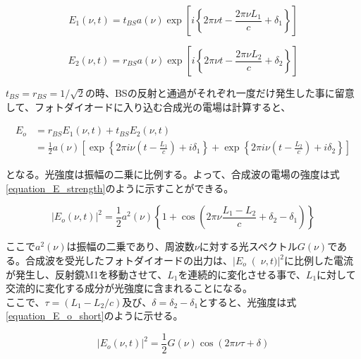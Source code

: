\documentclass[uplatex, titlepage, fontsize=10pt, paper=a4paper]{jsarticle}
\numberwithin{equation}{section}
\begin{document}
\begin{equation}
    E_{1}(\nu, t) = t_{BS}a(\nu)\exp\left[i\left\{{2{\pi\nu}t-{\frac{2{\pi\nu}L_1}{c}}+\delta_1}\right\}\right] 
    \label{equation_E_M1}
\end{equation}

\begin{equation}
    E_{2}(\nu, t) = r_{BS}a(\nu)\exp\left[i\left\{{2{\pi\nu}t-{\frac{2{\pi\nu}L_2}{c}}+\delta_2}\right\}\right] 
    \label{equation_E_M2}
\end{equation}

$t_{BS}=r_{BS}=1/\sqrt{2}$の時、BSの反射と通過がそれぞれ一度だけ発生した事に留意して、フォトダイオードに入り込む合成光の電場は計算すると、

\begin{equation}
    \begin{split}
    E_{o}&=r_{BS}E_{1}(\nu,t)+t_{BS}E_{2}(\nu,t)\\
    &=\frac{1}{2}a(\nu)\left[\exp \left\{2\pi{i\nu}\left(t-\frac{L_1}{c}\right)+i\delta_1 \right\}+\exp \left\{2\pi{i\nu}\left(t-\frac{L_2}{c}\right)+i\delta_2 \right\} \right] 
    \label{equation_E_o}
    \end{split}
\end{equation}

となる。光強度は振幅の二乗に比例する。よって、合成波の電場の強度は式\ref{equation_E_strength}のように示すことができる。

\begin{equation}
    {\left\lvert E_{o}(\nu, t)\right\rvert} ^2 = \frac{1}{2}a^{2}(\nu)\left\{1+\cos\left(2\pi\nu\frac{L_{1}-L_{2}}{c}+\delta_{2}-\delta_{1}\right) \right\} 
    \label{equation_E_strength}
\end{equation}

ここで$a^{2}(\nu)$は振幅の二乗であり、周波数$\nu$に対する光スペクトル$G(\nu)$である。合成波を受光したフォトダイオードの出力は、$\left\lvert E_{o}\right(\nu,t)\rvert ^2$に比例した電流が発生し、反射鏡M1を移動させて、$L_{1}$を連続的に変化させる事で、$L_{1}$に対して交流的に変化する成分が光強度に含まれることになる。\\
ここで、$\tau=(L_{1}-L_{2}/c)$及び、$\delta=\delta_{2}-\delta_{1}$とすると、光強度は式\ref{equation_E_o_short}のように示せる。

\begin{equation}
    {\left\lvert E_{o}(\nu,t)\right\rvert}^2=\frac{1}{2}G(\nu)\cos(2\pi\nu\tau+\delta)
    \label{equation_E_o_short}
\end{equation}
\end{document}

